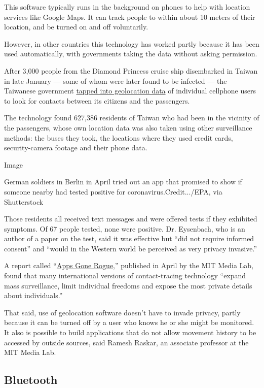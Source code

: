 This software typically runs in the background on phones to help with
location services like Google Maps. It can track people to within about
10 meters of their location, and be turned on and off voluntarily.

However, in other countries this technology has worked partly because it
has been used automatically, with governments taking the data without
asking permission.

After 3,000 people from the Diamond Princess cruise ship disembarked in
Taiwan in late January --- some of whom were later found to be infected
--- the Taiwanese government
\href{https://www.jmir.org/2020/5/e19540/}{tapped into geolocation data}
of individual cellphone users to look for contacts between its citizens
and the passengers.

The technology found 627,386 residents of Taiwan who had been in the
vicinity of the passengers, whose own location data was also taken using
other surveillance methods: the buses they took, the locations where
they used credit cards, security-camera footage and their phone data.

Image

German soldiers in Berlin in April tried out an app that promised to
show if someone nearby had tested positive for
coronavirus.Credit.../EPA, via Shutterstock

Those residents all received text messages and were offered tests if
they exhibited symptoms. Of 67 people tested, none were positive. Dr.
Eysenbach, who is an author of a paper on the test, said it was
effective but ``did not require informed consent'' and ``would in the
Western world be perceived as very privacy invasive.''

A report called ``\href{https://arxiv.org/pdf/2003.08567.pdf}{Apps Gone
Rogue,}'' published in April by the MIT Media Lab, found that many
international versions of contact-tracing technology ``expand mass
surveillance, limit individual freedoms and expose the most private
details about individuals.''

That said, use of geolocation software doesn't have to invade privacy,
partly because it can be turned off by a user who knows he or she might
be monitored. It also is possible to build applications that do not
allow movement history to be accessed by outside sources, said Ramesh
Raskar, an associate professor at the MIT Media Lab.

\hypertarget{bluetooth}{%
\subsection{Bluetooth}\label{bluetooth}}

